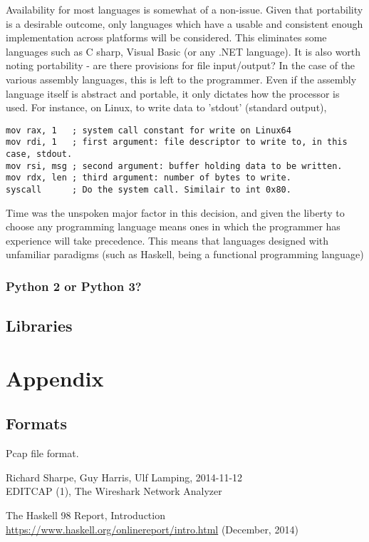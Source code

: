 \documentclass[10pt,a4paper]{report}
\begin{document}
Availability for most languages is somewhat of a non-issue. Given that portability is a desirable outcome, only languages which have a usable and consistent enough implementation across platforms will be considered. This eliminates some languages such as C sharp, Visual Basic (or any .NET language).
It is also worth noting portability - are there provisions for file input/output? In the case of the various assembly languages, this is left to the programmer. Even if the assembly language itself is abstract and portable, it only dictates how the processor is used. For instance, on Linux, to write data to 'stdout' (standard output),

\begin{lstlisting}[language={[x64]Assembler}]
mov rax, 1   ; system call constant for write on Linux64
mov rdi, 1   ; first argument: file descriptor to write to, in this case, stdout.
mov rsi, msg ; second argument: buffer holding data to be written.
mov rdx, len ; third argument: number of bytes to write.
syscall      ; Do the system call. Similair to int 0x80.
\end{lstlisting}

Time was the unspoken major factor in this decision, and given the liberty to choose any programming language means ones in which the programmer has experience will take precedence. This means that languages designed with unfamiliar paradigms (such as Haskell, being a functional programming language\cite{haskfunc})

\subsection{Python 2 or Python 3?}

\section{Libraries}
\chapter{Appendix}
\section{Formats}
Pcap file format.

\begin{thebibliography}{99}
    Richard Sharpe, Guy Harris, Ulf Lamping, 2014-11-12\\
    EDITCAP (1), The Wireshark Network Analyzer

    The Haskell 98 Report, Introduction\\
    
    \url{https://www.haskell.org/onlinereport/intro.html} (December, 2014)

\end{thebibliography}
\end{document}
